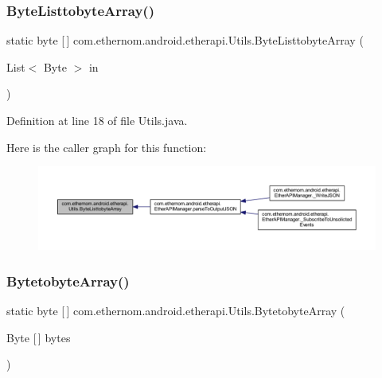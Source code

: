 \subsubsection{\texorpdfstring{Byte\+Listtobyte\+Array()}{ByteListtobyteArray()}}
{\footnotesize\ttfamily static byte \mbox{[}$\,$\mbox{]} com.\+ethernom.\+android.\+etherapi.\+Utils.\+Byte\+Listtobyte\+Array (\begin{DoxyParamCaption}\item[{List$<$ Byte $>$}]{in }\end{DoxyParamCaption})\hspace{0.3cm}{\ttfamily [static]}}



Definition at line 18 of file Utils.\+java.

Here is the caller graph for this function\+:
\nopagebreak
\begin{figure}[H]
\begin{center}
\leavevmode
\includegraphics[width=350pt]{classcom_1_1ethernom_1_1android_1_1etherapi_1_1_utils_a9a9518eff31b31c6a2b3d432a4f40d0a_icgraph}
\end{center}
\end{figure}
\mbox{\label{classcom_1_1ethernom_1_1android_1_1etherapi_1_1_utils_acb76bf0189f4655b3405298263a1e1f2}} 
\subsubsection{\texorpdfstring{Bytetobyte\+Array()}{BytetobyteArray()}}
{\footnotesize\ttfamily static byte \mbox{[}$\,$\mbox{]} com.\+ethernom.\+android.\+etherapi.\+Utils.\+Bytetobyte\+Array (\begin{DoxyParamCaption}\item[{Byte \mbox{[}$\,$\mbox{]}}]{bytes }\end{DoxyParamCaption})\hspace{0.3cm}{\ttfamily [static]}}



